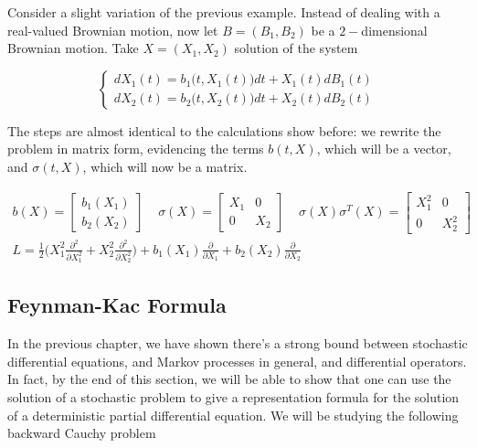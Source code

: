 Consider a slight variation of the previous example. Instead of dealing with a real-valued Brownian motion, now let $B = (B_1,B_2)$ be a $2-$dimensional Brownian motion. Take $X = (X_1,X_2)$ solution of the system

\begin{equation*}
    \begin{cases}
        dX_1(t) = b_1\big(t,X_1(t)\big)dt+X_1(t)dB_1(t) \\
        dX_2(t) = b_2\big(t,X_2(t)\big)dt+X_2(t)dB_2(t)
    \end{cases}
\end{equation*}

The steps are almost identical to the calculations show before: we rewrite the problem in matrix form, evidencing the terms $b(t,X)$, which will be a vector, and $\sigma(t,X)$, which will now be a matrix. 

\begin{gather*}
    b(X) = 
    \begin{bmatrix}
        b_1(X_1) \\
        b_2(X_2)
    \end{bmatrix}
    \;\;\;\;
    \sigma(X) = 
    \begin{bmatrix}
        X_1 & 0 \\
        0 & X_2
    \end{bmatrix}
    \;\;\;\;
    \sigma(X) \sigma^T(X) = 
    \begin{bmatrix}
        X_1^2 & 0 \\
        0 & X_2^2
    \end{bmatrix}\\
    L = \frac{1}{2}\Bigg( X_1^2 \frac{\partial^2}{\partial X_1^2} + X_2^2 \frac{\partial^2}{\partial X_2^2}\Bigg) + b_1(X_1) \frac{\partial}{\partial X_1} + b_2(X_2) \frac{\partial}{\partial X_2}
\end{gather*}

\subsection{Feynman-Kac Formula}
In the previous chapter, we have shown there's a strong bound between stochastic differential equations, and Markov processes in general, and differential operators. In fact, by the end of this section, we will be able to show that one can use the solution of a stochastic problem to give a representation formula for the solution of a deterministic partial differential equation. We will be studying the following backward Cauchy problem


